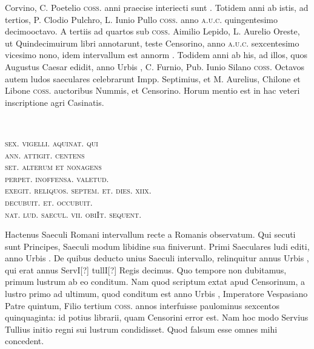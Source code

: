 Corvino, C. Poetelio \textsc{coss.} anni praecise interiecti sunt .
Totidem
anni ab istis, ad tertios, P. Clodio Pulchro, L. Iunio Pullo \textsc{coss.}
anno \textsc{a.u.c.} quingentesimo decimooctavo.
A tertiis ad quartos sub
\textsc{coss.} Aimilio Lepido, L. Aurelio Oreste, ut Quindecimuirum
libri annotarunt, teste Censorino, anno \textsc{a.u.c.} sexcentesimo vicesimo
nono, idem intervallum est annorm .
Todidem anni ab
his, ad illos, quos Augustus Caesar edidit, anno Urbis ,
C. Furnio, Pub. Iunio Silano \textsc{coss.} Octavos autem ludos saeculares
celebrarunt Impp. Septimius, et M. Aurelius, Chilone et Libone
\textsc{coss.} auctoribus Nummis, et Censorino.
Horum mentio est
in hac veteri inscriptione agri Casinatis.
%
\begin{center}
\providelength{\emenlen}
\parbox{\emenlen}{
  \\
  \raggedright\textsc{sex. vigelli. aquinat. qui\\
  ann. attigit. centens\\
  set. alterum et nonagens\\
  perpet. inoffensa. valetud.\\
  exegit. reliquos. septem. et. dies. xiix.\\
  \hspace{4ex} decubuit. et. occubuit.\\
  nat. lud. saecul. vii. obiIt. sequent.}
}
\end{center}
Hactenus Saeculi Romani intervallum recte a
 Romanis observatum.
Qui secuti sunt Principes, Saeculi modum libidine sua finiverunt.
Primi
Saeculares ludi editi, anno Urbis .
De quibus deducto
unius Saeculi intervallo, relinquitur annus Urbis , qui
erat annus ServI[?] tullI[?] Regis decimus. %
Quo tempore non dubitamus,
primum lustrum ab eo conditum.
Nam quod scriptum extat apud
Censorinum, a lustro primo ad ultimum, quod conditum est anno
Urbis , Imperatore Vespasiano Patre quintum, Filio
tertium \textsc{coss.} annos
interfuisse paulominus
sexcentos quinquaginta:
id potius librarii,
quam Censorini
error est.
Nam
hoc modo Servius
Tullius initio regni
sui lustrum condidisset.
Quod falsum esse
omnes mihi concedent.
